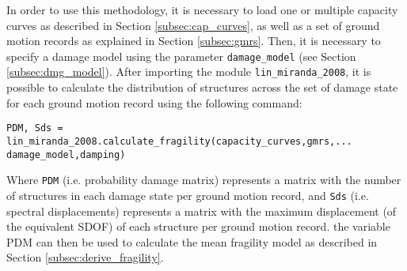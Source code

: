 In order to use this methodology, it is necessary to load one or multiple capacity curves as described in Section \ref{subsec:cap_curves}, as well as a set of ground motion records as explained in Section \ref{subsec:gmrs}. Then, it is necessary to specify a damage model using the parameter \verb=damage_model= (see Section \ref{subsec:dmg_model}). After importing the module \verb=lin_miranda_2008=, it is possible to calculate the distribution of structures across the set of damage state for each ground motion record using the following command:

\begin{Verbatim}[frame=single, commandchars=\\\{\}, samepage=true]
PDM, Sds = lin_miranda_2008.calculate_fragility(capacity_curves,gmrs,...
damage_model,damping)
\end{Verbatim}

Where \verb=PDM= (i.e. probability damage matrix) represents a matrix with the number of structures in each damage state per ground motion record, and \verb=Sds= (i.e. spectral displacements) represents a matrix with the maximum displacement (of the equivalent SDOF) of each structure per ground motion record. the variable PDM can then be used to calculate the mean fragility model as described in Section \ref{subsec:derive_fragility}.




